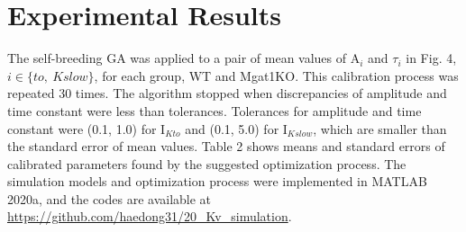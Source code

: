 \documentclass[journal]{IEEEtran}
\begin{document}
\section{Experimental Results}
\begin{table}
    \caption{Calibrated model parameters}
    \label{table2}
    \centering
\end{table}
The self-breeding GA was applied to a pair of mean values of $\text{A}_i$ and $\tau_i$ in Fig. 4, $i \in \{to,\ Kslow\}$, for each group, WT and Mgat1KO. This calibration process was repeated 30 times. The algorithm stopped when discrepancies of amplitude and time constant were less than tolerances. Tolerances for amplitude and time constant were (0.1, 1.0) for $\text{I}_{Kto}$ and (0.1, 5.0) for $\text{I}_{Kslow}$, which are smaller than the standard error of mean values. Table 2 shows means and standard errors of calibrated parameters found by the suggested optimization process. The simulation models and optimization process were implemented in MATLAB 2020a, and the codes are available at \url{https://github.com/haedong31/20_Kv_simulation}.
\end{document}
